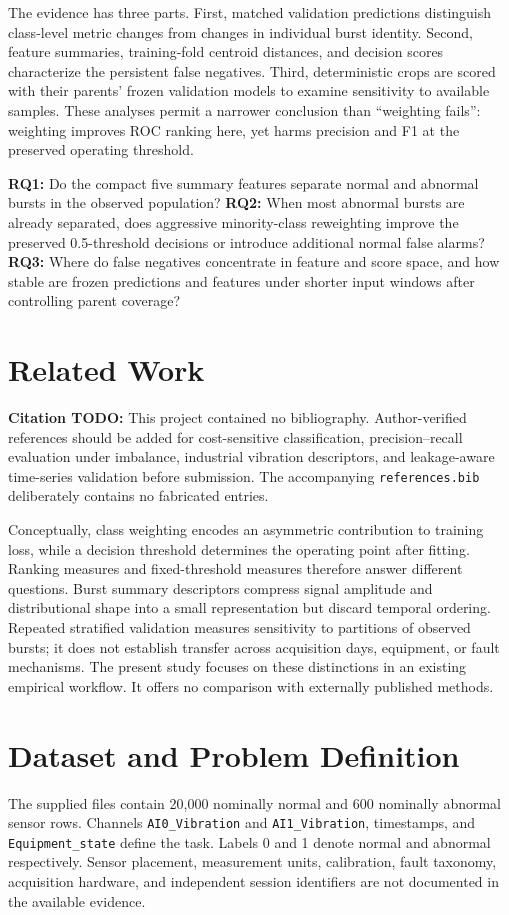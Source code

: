 \documentclass[10pt,twocolumn,letterpaper]{article}
\begin{document}
The evidence has three parts. First, matched validation predictions distinguish class-level metric changes from changes in individual burst identity. Second, feature summaries, training-fold centroid distances, and decision scores characterize the persistent false negatives. Third, deterministic crops are scored with their parents' frozen validation models to examine sensitivity to available samples. These analyses permit a narrower conclusion than ``weighting fails'': weighting improves ROC ranking here, yet harms precision and F1 at the preserved operating threshold.

\textbf{RQ1:} Do the compact five summary features separate normal and abnormal bursts in the observed population? \textbf{RQ2:} When most abnormal bursts are already separated, does aggressive minority-class reweighting improve the preserved 0.5-threshold decisions or introduce additional normal false alarms? \textbf{RQ3:} Where do false negatives concentrate in feature and score space, and how stable are frozen predictions and features under shorter input windows after controlling parent coverage?

\section{Related Work}
\textbf{Citation TODO:} This project contained no bibliography. Author-verified references should be added for cost-sensitive classification, precision--recall evaluation under imbalance, industrial vibration descriptors, and leakage-aware time-series validation before submission. The accompanying \texttt{references.bib} deliberately contains no fabricated entries.

Conceptually, class weighting encodes an asymmetric contribution to training loss, while a decision threshold determines the operating point after fitting. Ranking measures and fixed-threshold measures therefore answer different questions. Burst summary descriptors compress signal amplitude and distributional shape into a small representation but discard temporal ordering. Repeated stratified validation measures sensitivity to partitions of observed bursts; it does not establish transfer across acquisition days, equipment, or fault mechanisms. The present study focuses on these distinctions in an existing empirical workflow. It offers no comparison with externally published methods.

\section{Dataset and Problem Definition}
The supplied files contain 20,000 nominally normal and 600 nominally abnormal sensor rows. Channels \texttt{AI0\_Vibration} and \texttt{AI1\_Vibration}, timestamps, and \texttt{Equipment\_state} define the task. Labels 0 and 1 denote normal and abnormal respectively. Sensor placement, measurement units, calibration, fault taxonomy, acquisition hardware, and independent session identifiers are not documented in the available evidence.
\end{document}
